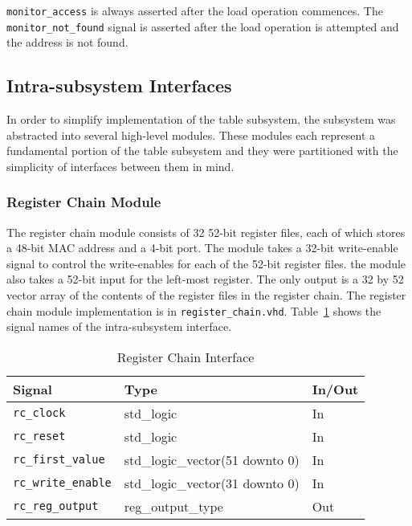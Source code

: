 \documentclass{article}
\begin{document}
\texttt{monitor\_access} is always asserted after the load operation commences. The \texttt{monitor\_not\_found} signal is asserted after the load operation is attempted and the address is not found.

\subsection{Intra-subsystem Interfaces}

In order to simplify implementation of the table subsystem, the subsystem was abstracted into several high-level modules. These modules each represent a fundamental portion of the table subsystem and they were partitioned with the simplicity of interfaces between them in mind. 

\subsubsection{Register Chain Module}

The register chain module consists of 32 52-bit register files, each of which stores a 48-bit MAC address and a 4-bit port. The module takes a 32-bit write-enable signal to control the write-enables for each of the 52-bit register files. the module also takes a 52-bit input for the left-most register. The only output is a 32 by 52 vector array of the contents of the register files in the register chain. The register chain module implementation is in \texttt{register\_chain.vhd}. Table~\ref{tab:reg} shows the signal names of the intra-subsystem interface. 


\begin{table}[ht]
    \begin{center}
        \begin{tabular}{lll}\hline
        Signal & Type & In/Out \\
        \hline
        \texttt{rc\_clock} & std\_logic & In \\
        \hline
        \texttt{rc\_reset} & std\_logic & In \\
        \hline
        \texttt{rc\_first\_value} & std\_logic\_vector(51 downto 0) & In \\
        \hline
        \texttt{rc\_write\_enable} & std\_logic\_vector(31 downto 0) & In \\
        \hline
        \texttt{rc\_reg\_output} & reg\_output\_type & Out \\
        \hline
        \end{tabular}
        \caption{Register Chain Interface}\label{tab:reg}
    \end{center}
\end{table}
\end{document}
